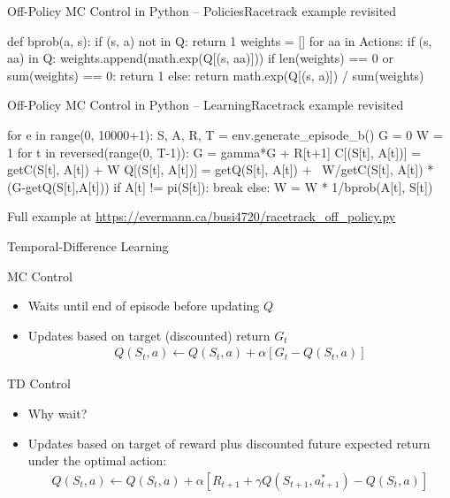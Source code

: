 \documentclass[ignorenonframetext,xcolor=x11names]{beamer}
\begin{document}
\begin{frame}[label=withcode,fragile]{Off-Policy MC Control in Python -- Policies}{Racetrack example revisited}
\begin{pythoncode}
def bprob(a, s):
    if (s, a) not in Q:
        return 1
    weights = []
    for aa in Actions:
        if (s, aa) in Q:
            weights.append(math.exp(Q[(s, aa)]))
    if len(weights) == 0 or sum(weights) == 0:
        return 1
    else:
        return math.exp(Q[(s, a)]) / sum(weights)
\end{pythoncode}
\end{frame}



\begin{frame}[label=withcode,fragile]{Off-Policy MC Control in Python -- Learning}{Racetrack example revisited}
\begin{pythoncode}
for e in range(0, 10000+1):
    S, A, R, T = env.generate_episode_b()
    G = 0
    W = 1
    for t in reversed(range(0, T-1)):
        G = gamma*G + R[t+1]
        C[(S[t], A[t])] = getC(S[t], A[t]) + W
        Q[(S[t], A[t])] = getQ(S[t], A[t]) + \
               W/getC(S[t], A[t]) * (G-getQ(S[t],A[t]))
        if A[t] != pi(S[t]):
            break
        else:
            W = W * 1/bprob(A[t], S[t])
\end{pythoncode}
\footnotesize

Full example at \url{https://evermann.ca/busi4720/racetrack_off_policy.py}
\end{frame}

\begin{frame}[label=full]{Temporal-Difference Learning}
\begin{block}{MC Control}
\begin{itemize}
   \item Waits until end of episode before updating $Q$
   \item Updates based on target (discounted) return $G_t$ 
   \begin{align*}
   Q(S_t, a) \leftarrow Q(S_t, a) + \alpha \left[ G_t - Q(S_t, a) \right]
   \end{align*}
\end{itemize}
\end{block}

\begin{block}{TD Control}
\begin{itemize}
   \item Why wait?
   \item Updates based on target of reward plus discounted future expected return under the optimal action:
   \begin{align*}
   Q(S_t, a) \leftarrow Q(S_t, a) + \alpha \left[ R_{t+1} + \gamma Q(S_{t+1}, a_{t+1}^*) - Q(S_t, a) \right]
   \end{align*}
\end{itemize}
\end{block}
\end{frame}
\end{document}
